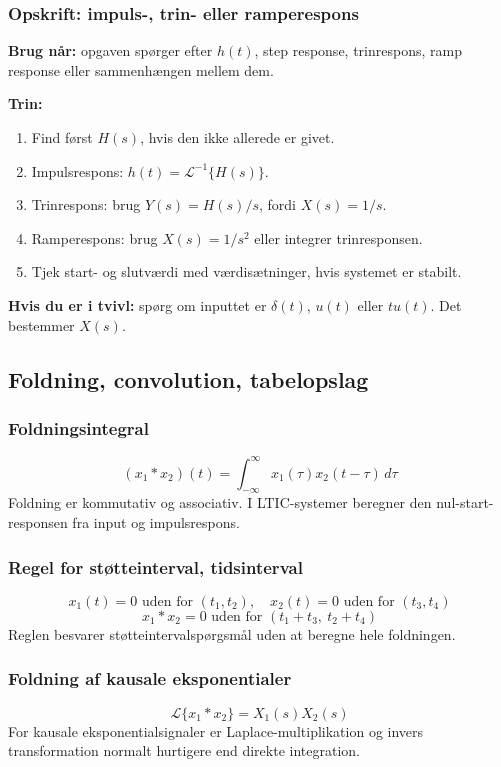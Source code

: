 \subsubsection{Opskrift: impuls-, trin- eller ramperespons}
\textbf{Brug når:} opgaven spørger efter \(h(t)\), step response, trinrespons, ramp response eller sammenhængen mellem dem.

\textbf{Trin:}
\begin{enumerate}
    \item Find først \(H(s)\), hvis den ikke allerede er givet.
    \item Impulsrespons: \(h(t)=\mathcal{L}^{-1}\{H(s)\}\).
    \item Trinrespons: brug \(Y(s)=H(s)/s\), fordi \(X(s)=1/s\).
    \item Ramperespons: brug \(X(s)=1/s^2\) eller integrer trinresponsen.
    \item Tjek start- og slutværdi med værdisætninger, hvis systemet er stabilt.
\end{enumerate}

\textbf{Hvis du er i tvivl:} spørg om inputtet er \(\delta(t)\), \(u(t)\) eller \(t u(t)\). Det bestemmer \(X(s)\).

\subsection{Foldning, convolution, tabelopslag}

\subsubsection{Foldningsintegral}
\[
(x_1*x_2)(t)=\int_{-\infty}^{\infty}x_1(\tau)x_2(t-\tau)\,d\tau
\]
Foldning er kommutativ og associativ. I LTIC-systemer beregner den nul-start-responsen fra input og impulsrespons.

\subsubsection{Regel for støtteinterval, tidsinterval}
\[
x_1(t)=0\text{ uden for }(t_1,t_2),\quad x_2(t)=0\text{ uden for }(t_3,t_4)
\]
\[
x_1*x_2=0\text{ uden for }(t_1+t_3,\ t_2+t_4)
\]
Reglen besvarer støtteintervalspørgsmål uden at beregne hele foldningen.

\subsubsection{Foldning af kausale eksponentialer}
\[
\mathcal{L}\{x_1*x_2\}=X_1(s)X_2(s)
\]
For kausale eksponentialsignaler er Laplace-multiplikation og invers transformation normalt hurtigere end direkte integration.

